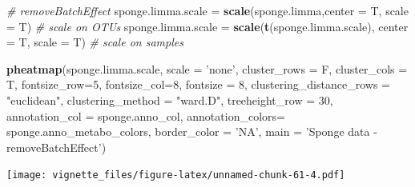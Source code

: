 \documentclass[]{book}
\newenvironment{Shaded}{\begin{snugshade}}{\end{snugshade}}
\newcommand{\KeywordTok}[1]{\textcolor[rgb]{0.13,0.29,0.53}{\textbf{#1}}}
\newcommand{\DataTypeTok}[1]{\textcolor[rgb]{0.13,0.29,0.53}{#1}}
\newcommand{\DecValTok}[1]{\textcolor[rgb]{0.00,0.00,0.81}{#1}}
\newcommand{\StringTok}[1]{\textcolor[rgb]{0.31,0.60,0.02}{#1}}
\newcommand{\CommentTok}[1]{\textcolor[rgb]{0.56,0.35,0.01}{\textit{#1}}}
\newcommand{\NormalTok}[1]{#1}
\begin{document}
\begin{Shaded}
\begin{Highlighting}[]
\CommentTok{# removeBatchEffect}
\NormalTok{sponge.limma.scale =}\StringTok{ }\KeywordTok{scale}\NormalTok{(sponge.limma,}\DataTypeTok{center =}\NormalTok{ T, }\DataTypeTok{scale =}\NormalTok{ T) }\CommentTok{# scale on OTUs}
\NormalTok{sponge.limma.scale =}\StringTok{ }\KeywordTok{scale}\NormalTok{(}\KeywordTok{t}\NormalTok{(sponge.limma.scale), }\DataTypeTok{center =}\NormalTok{ T, }\DataTypeTok{scale =}\NormalTok{ T) }\CommentTok{# scale on samples}

\KeywordTok{pheatmap}\NormalTok{(sponge.limma.scale, }
         \DataTypeTok{scale =} \StringTok{'none'}\NormalTok{, }
         \DataTypeTok{cluster_rows =}\NormalTok{ F, }
         \DataTypeTok{cluster_cols =}\NormalTok{ T, }
         \DataTypeTok{fontsize_row=}\DecValTok{5}\NormalTok{, }\DataTypeTok{fontsize_col=}\DecValTok{8}\NormalTok{,}
         \DataTypeTok{fontsize =} \DecValTok{8}\NormalTok{,}
         \DataTypeTok{clustering_distance_rows =} \StringTok{"euclidean"}\NormalTok{,}
         \DataTypeTok{clustering_method =} \StringTok{"ward.D"}\NormalTok{,}
         \DataTypeTok{treeheight_row =} \DecValTok{30}\NormalTok{,}
         \DataTypeTok{annotation_col =}\NormalTok{ sponge.anno_col,}
         \DataTypeTok{annotation_colors=}\NormalTok{ sponge.anno_metabo_colors,}
         \DataTypeTok{border_color =} \StringTok{'NA'}\NormalTok{,}
         \DataTypeTok{main =} \StringTok{'Sponge data - removeBatchEffect'}\NormalTok{)}
\end{Highlighting}
\end{Shaded}

\texttt{[image: vignette\_files/figure-latex/unnamed-chunk-61-4.pdf]}
\end{document}

